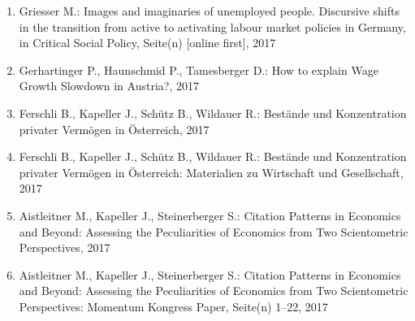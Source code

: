 \begin{enumerate}
	 \item Griesser M.: Images and imaginaries of unemployed people. Discursive shifts in the transition from active to activating labour market policies in Germany, in Critical Social Policy, Seite(n) [online first], 2017
	 \item Gerhartinger P., Haunschmid P., Tamesberger D.: How to explain Wage Growth Slowdown in Austria?, 2017
	 \item Ferschli B., Kapeller J., Schütz B., Wildauer R.: Bestände und Konzentration privater Vermögen in Österreich, 2017
	 \item Ferschli B., Kapeller J., Schütz B., Wildauer R.: Bestände und Konzentration privater Vermögen in Österreich: Materialien zu Wirtschaft und Gesellschaft, 2017
	 \item Aistleitner M., Kapeller J., Steinerberger S.: Citation Patterns in Economics and Beyond: Assessing the Peculiarities of Economics from Two Scientometric Perspectives, 2017
	 \item Aistleitner M., Kapeller J., Steinerberger S.: Citation Patterns in Economics and Beyond: Assessing the Peculiarities of Economics from Two Scientometric Perspectives: Momentum Kongress Paper, Seite(n) 1--22, 2017
\end{enumerate}
